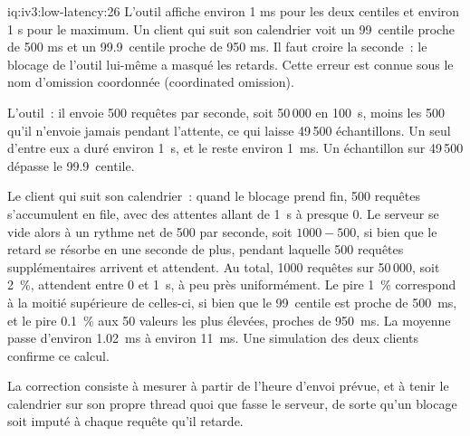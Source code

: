 \begin{solution}{iq:iv3:low-latency:26}
L'outil affiche environ 1 ms pour les deux centiles et environ 1 s pour le maximum. Un client qui suit son calendrier voit un 99~centile proche de 500 ms et un 99.9~centile proche de 950 ms. Il faut croire la seconde~: le blocage de l'outil lui-même a masqué les retards. Cette erreur est connue sous le nom d'omission coordonnée (coordinated omission).

L'outil~: il envoie 500 requêtes par seconde, soit 50\,000 en 100~s, moins les 500 qu'il n'envoie jamais pendant l'attente, ce qui laisse 49\,500 échantillons. Un seul d'entre eux a duré environ 1~s, et le reste environ 1~ms. Un échantillon sur 49\,500 dépasse le 99.9~centile.

Le client qui suit son calendrier~: quand le blocage prend fin, 500 requêtes s'accumulent en file, avec des attentes allant de 1~s à presque 0. Le serveur se vide alors à un rythme net de 500 par seconde, soit $1000 - 500$, si bien que le retard se résorbe en une seconde de plus, pendant laquelle 500 requêtes supplémentaires arrivent et attendent. Au total, 1000 requêtes sur 50\,000, soit 2~\%, attendent entre 0 et 1~s, à peu près uniformément. Le pire 1~\% correspond à la moitié supérieure de celles-ci, si bien que le 99~centile est proche de 500~ms, et le pire 0.1~\% aux 50 valeurs les plus élevées, proches de 950~ms. La moyenne passe d'environ 1.02~ms à environ 11~ms. Une simulation des deux clients confirme ce calcul.

La correction consiste à mesurer à partir de l'heure d'envoi prévue, et à tenir le calendrier sur son propre thread quoi que fasse le serveur, de sorte qu'un blocage soit imputé à chaque requête qu'il retarde.

\end{solution}

